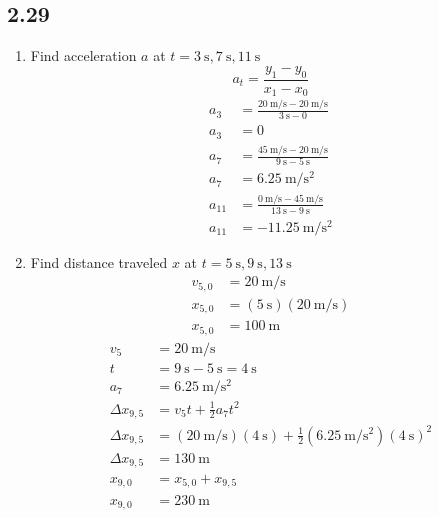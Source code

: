 \documentclass{article}
\begin{document}
\subsection{2.29}
\begin{enumerate}[label=\textbf{(\alph*)}]
	\item
		Find acceleration $ a $ at $ t = \SI{3}{\second}, \SI{7}{\second}, \SI{11}{\second} $
		$$ a_t = \frac{y_1 - y_0}{x_1 - x_0} $$
		\begin{align*}
			a_3 & = \frac{\SI{20}{\meter \per \second} - \SI{20}{\meter \per \second}}{\SI{3}{\second} - 0} \\
			a_3 & = 0 \\
			a_7 & = \frac{\SI{45}{\meter \per \second} - \SI{20}{\meter \per \second}}{\SI{9}{\second} - \SI{5}{\second}} \\
			a_7 & = \SI{6.25}{\meter \per \second \squared} \\
			a_{11} & = \frac{\SI{0}{\meter \per \second} - \SI{45}{\meter \per \second}}{\SI{13}{\second} - \SI{9}{\second}} \\
			a_{11} & = \SI{-11.25}{\meter \per \second \squared}
		\end{align*}
	\item
		Find distance traveled $ x $ at $ t = \SI{5}{\second}, \SI{9}{\second}, \SI{13}{\second} $
		\begin{align*}
			v_{5,0} & = \SI{20}{\meter \per \second} \\
			x_{5,0} & = (\SI{5}{\second})(\SI{20}{\meter \per \second}) \\
			x_{5,0} & = \SI{100}{\meter}
		\end{align*}
		\begin{align*}
			v_5 & = \SI{20}{\meter \per \second} \\
			t & = \SI{9}{\second} - \SI{5}{\second} = \SI{4}{\second} \\
			a_7 & = \SI{6.25}{\meter \per \second \squared} \\
			\Delta x_{9,5} & = v_5t + \frac{1}{2}a_7t^2 \\
			\Delta x_{9,5} & = (\SI{20}{\meter \per \second})(\SI{4}{\second}) + \frac{1}{2}(\SI{6.25}{\meter \per \second \squared})(\SI{4}{\second})^2 \\
			\Delta x_{9,5} & = \SI{130}{\meter} \\
			x_{9,0} & = x_{5,0} + x_{9,5} \\
			x_{9,0} & = \SI{230}{\meter}

\end{align*}
\end{enumerate}
\end{document}
